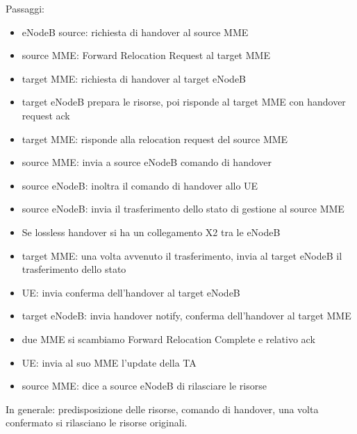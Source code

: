 Passaggi: 
\begin{itemize}
    \item eNodeB source: richiesta di handover al source MME 
    
    \item source MME: Forward Relocation Request al target MME 
    
    \item target MME: richiesta di handover al target eNodeB
    
    \item target eNodeB prepara le risorse, poi risponde al target MME con handover request ack
    
    \item target MME: risponde alla relocation request del source MME
    
    \item source MME: invia a source eNodeB comando di handover
    
    \item source eNodeB: inoltra il comando di handover allo UE
    
    \item source eNodeB: invia il trasferimento dello stato di gestione al source MME
    
    \item Se lossless handover si ha un collegamento X2 tra le eNodeB
    
    \item target MME: una volta avvenuto il trasferimento, invia al target eNodeB il trasferimento dello stato
    
    \item UE: invia conferma dell'handover al target eNodeB
    
    \item target eNodeB: invia handover notify, conferma dell'handover al target MME
    
    \item due MME si scambiamo Forward Relocation Complete e relativo ack
    
    \item UE: invia al suo MME l'update della TA
    
    \item source MME: dice a source eNodeB di rilasciare le risorse
\end{itemize}

In generale: predisposizione delle risorse, comando di handover, una volta confermato si rilasciano le risorse originali.

